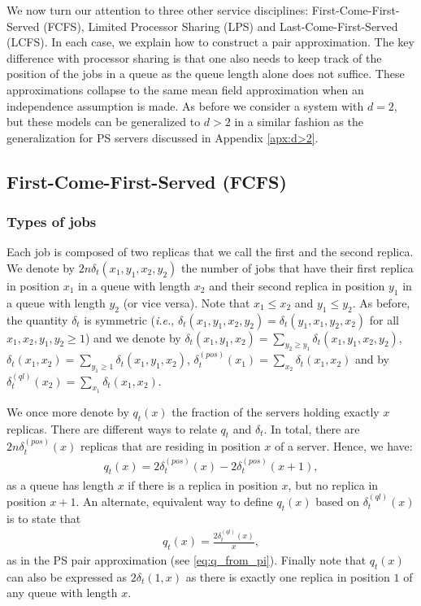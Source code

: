 \documentclass[acmsmall,nonacm]{acmart}
\begin{document}
We now turn our attention to three other service disciplines: First-Come-First-Served (FCFS), Limited Processor Sharing (LPS) and Last-Come-First-Served (LCFS). In each case, we explain how to construct a pair approximation. The key difference with processor sharing is that one also needs to keep track of the position of the jobs in a queue as the queue length
alone does not suffice.  These approximations collapse to the same mean field approximation when an independence assumption is made.  As before we consider a system with $d=2$,
but these models can be generalized to $d>2$ in a similar fashion as the generalization for
PS servers discussed in Appendix \ref{apx:d>2}. 

\subsection{First-Come-First-Served (FCFS)}\label{sec:FCFS}



\subsubsection{Types of jobs}


Each job is composed of two replicas that we call the first and the second replica. We denote by $2n\delta_t(x_1,y_1,x_2,y_2)$ the number of jobs that have their first replica  in position $x_1$ 
in a queue with length $x_2$ and their second replica in position $y_1$ in a queue with length $y_2$
(or vice versa). Note that $x_1 \leq x_2$ and $y_1 \leq y_2$.
As before, the quantity $\delta_t$ is symmetric (\emph{i.e.}, $\delta_t(x_1,y_1,x_2,y_2)=\delta_t(y_1,x_1,y_2,x_2)$ for all $x_1,x_2,y_1,y_2\ge1$) and we denote by 
$\delta_t(x_1,y_1,x_2)=\sum_{y_2\ge y_1}\delta_t(x_1,y_1,x_2,y_2)$,  $\delta_t(x_1,x_2)=\sum_{y_1\ge1}\delta_t(x_1,y_1,x_2)$, $\delta_t^{(pos)}(x_1)=\sum_{x_2} \delta_t(x_1,x_2)$ and by  $\delta_t^{(ql)}(x_2)=\sum_{x_1} \delta_t(x_1,x_2)$. 

We once more denote by $q_t(x)$ the fraction of the servers holding exactly $x$ replicas. There are different ways to relate $q_t$ and $\delta_t$. In total, there are $2n\delta_t^{(pos)}(x)$ replicas that are residing in position $x$ of a server. Hence, we have: 
\begin{align}\label{eq:qxFCFS}
    q_t(x) = 2\delta_t^{(pos)}(x)- 2\delta_t^{(pos)}(x+1),
\end{align} 
as a queue has length $x$ if there is a replica in position $x$, but no replica in position $x+1$.
An alternate, equivalent way to define $q_t(x)$ based on $\delta_t^{(ql)}(x)$ is to state that
\begin{align}\label{eq:qxFCFS2}
    q_t(x) = \frac{2 \delta_t^{(ql)}(x)}{x},
\end{align} 
as in the PS pair approximation (see \eqref{eq:q_from_pi}).
Finally note that $q_t(x)$ can also be expressed as $2\delta_t(1,x)$ as there is exactly one replica
in position $1$ of any queue with length $x$.
\end{document}
